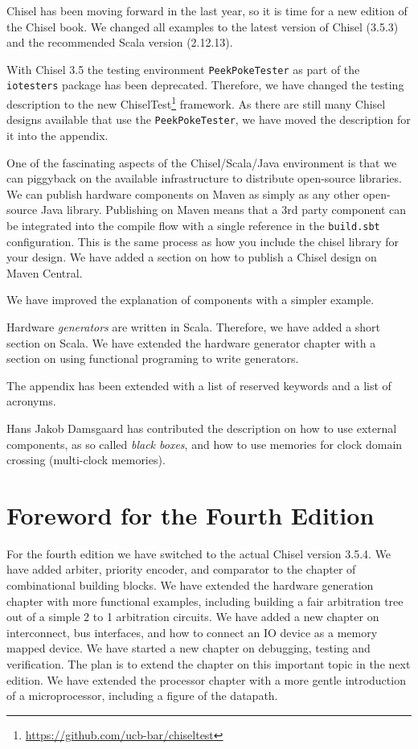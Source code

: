 \documentclass[%
    10pt,
    headinclude, footexclude,
    openright, %
    notitlepage,
    cleardoubleempty,
    headsepline,
    pointlessnumbers,
    bibtotoc, idxtotoc,
    ]{scrbook}
\newcommand{\code}[1]{{\small{\texttt{#1}}}}
\newcommand{\myref}[2]{\href{#1}{#2}}
\renewcommand{\myref}[2]{{#2}{\footnote{\url{#1}}}}
\begin{document}
Chisel has been moving forward in the last year, so it is time for a new edition of the Chisel book.
We changed all examples to the latest version of Chisel (3.5.3) and the recommended
Scala version (2.12.13).

With Chisel 3.5 the testing environment \code{PeekPokeTester} as part of the \code{iotesters}
package has been deprecated. Therefore, we have changed the testing description to the new
\myref{https://github.com/ucb-bar/chiseltest}{ChiselTest} framework.
As there are still many Chisel designs available that use the \code{PeekPokeTester},
we have moved the description for it into the appendix.

One of the fascinating aspects of the Chisel/Scala/Java environment is that we
can piggyback on the available infrastructure to distribute open-source libraries.
We can publish hardware components on Maven as simply as any other open-source Java library.
Publishing on Maven means that a 3rd party component can be integrated into the
compile flow with a single reference in the \code{build.sbt} configuration.
This is the same process as how you include the chisel library for your design.
We have added a section on how to publish a Chisel design on Maven Central.

We have improved the explanation of components with a simpler example.

Hardware \emph{generators} are written in Scala. Therefore, we have added a short
section on Scala. We have extended the hardware generator chapter with a section
on using functional programing to write generators.

The appendix has been extended with a list of reserved keywords and a list
of acronyms.

Hans Jakob Damsgaard has contributed the description on how to use external components, as
so called \emph{black boxes}, and how to use memories for clock domain crossing
(multi-clock memories).

\section*{Foreword for the Fourth Edition}

For the fourth edition we have switched to the actual Chisel version 3.5.4.
We have added arbiter, priority encoder, and comparator to the chapter of
combinational building blocks.
We have extended the hardware generation chapter with more functional
examples, including building a fair arbitration tree out of a simple 2 to 1
arbitration circuits.
We have added a new chapter on interconnect, bus interfaces,
and how to connect an IO device as a memory mapped device.
We have started a new chapter on debugging, testing and verification.
The plan is to extend the chapter on this important topic in the next edition.
We have extended the processor chapter with a more gentle introduction
of a microprocessor, including a figure of the datapath.
\end{document}
